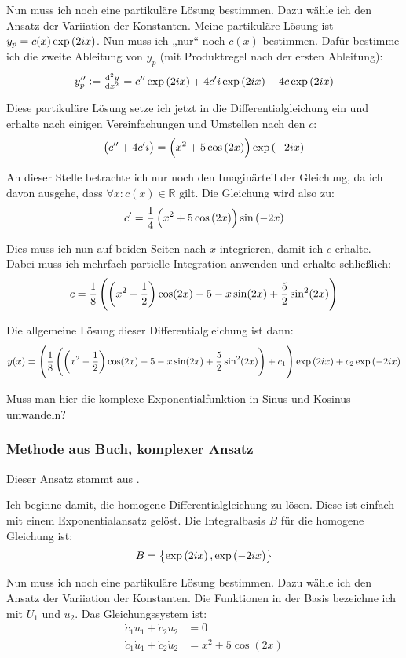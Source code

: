 \documentclass[11pt, ngerman]{article}
\begin{document}
Nun muss ich noch eine partikuläre Lösung bestimmen. Dazu wähle ich den Ansatz
der Variiation der Konstanten. Meine partikuläre Lösung ist $y_p = c(x) \ex$.
Nun muss ich „nur“ noch $c(x)$ bestimmen. Dafür bestimme ich die zweite
Ableitung von $y_p$ (mit Produktregel nach der ersten Ableitung):
\[
	y_p'' := \od[2] yx = c'' \ex + 4 c'i \ex - 4 c \ex
\]

Diese partikuläre Lösung setze ich jetzt in die Differentialgleichung ein und
erhalte nach einigen Vereinfachungen und Umstellen nach den $c$:
\[
	\del{c'' + 4c'i} = \del{x^2 + 5 \cos\del{2x}} \exp\del{-2ix}
\]

An dieser Stelle betrachte ich nur noch den Imaginärteil der Gleichung, da ich
davon ausgehe, dass $\forall x \colon c(x) \in \mathbb R$ gilt. Die Gleichung
wird also zu:
\[
	c' = \frac14 \del{x^2 + 5 \cos\del{2x}} \sin\del{-2x}
\]

Dies muss ich nun auf beiden Seiten nach $x$ integrieren, damit ich $c$
erhalte. Dabei muss ich mehrfach partielle Integration anwenden und erhalte
schließlich:
\[
	c = \frac 18 \del{\del{x^2 - \frac 12} \cos(2x) - 5 - x \sin(2x) + \frac 52
	\sin^2(2x)}
\]

Die allgemeine Lösung dieser Differentialgleichung ist dann:
\[
	y(x) = \del{\frac 18 \del{\del{x^2 - \frac 12} \cos(2x) - 5 - x \sin(2x) +
	\frac 52 \sin^2(2x)} + c_1} \ex + c_2 \exp\del{-2ix}
\]

Muss man hier die komplexe Exponentialfunktion in Sinus und Kosinus umwandeln?

\subsubsection{Methode aus Buch, komplexer Ansatz}

Dieser Ansatz stammt aus \cite[Seite 181]{heuser-dgl}.

Ich beginne damit, die homogene Differentialgleichung zu lösen. Diese ist
einfach mit einem Exponentialansatz gelöst. Die Integralbasis $B$ für die
homogene Gleichung ist:
\[
	B = \set{\ex, \exp\del{-2ix}}
\]

Nun muss ich noch eine partikuläre Lösung bestimmen. Dazu wähle ich den Ansatz
der Variiation der Konstanten. Die Funktionen in der Basis bezeichne ich mit
$U_1$ und $u_2$. Das Gleichungssystem ist:
\begin{align*}
	\dot c_1 u_1 + \dot c_2 u_2 &= 0 \\
	\dot c_1 \dot u_1 + \dot c_2 \dot u_2 &= x^2 + 5 \cos(2x)
\end{align*}
\end{document}
